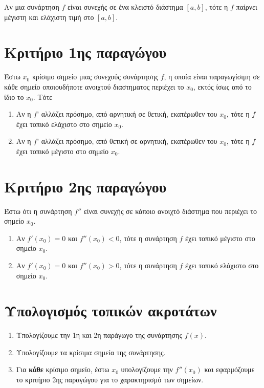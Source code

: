     

\begin{thm}
    Αν μια συνάρτηση $f$ είναι συνεχής σε ένα κλειστό διάστημα $ [a,b] $, τότε η $f$
    παίρνει μέγιστη και ελάχιστη τιμή στο $ [a,b] $.
\end{thm}

    \section*{Κριτήριο 1ης παραγώγου}
    Έστω $ x_{0} $ κρίσιμο σημείο μιας συνεχούς συνάρτησης $f$, η οποία είναι παραγωγίσιμη σε κάθε
    σημείο οποιουδήποτε ανοιχτού διαστηματος περιέχει το $ x_{0} $, εκτός ίσως από το ίδιο το $
    x_{0} $. Τότε
    \begin{enumerate}
        \item Αν η $f$' αλλάζει πρόσημο, από αρνητική σε θετική, εκατέρωθεν του $ x_{0} $, τότε η
            $f$ έχει τοπικό ελάχιστο στο σημείο $ x_{0} $.
        \item Αν η $f$' αλλάζει πρόσημο, από θετική σε αρνητική, εκατέρωθεν του $ x_{0} $, τότε η
            $f$ έχει τοπικό μέγιστο στο σημείο $ x_{0} $.
    \end{enumerate}

    \section*{Κριτήριο 2ης παραγώγου}
    Έστω ότι η συνάρτηση $ f'' $ είναι συνεχής σε κάποιο ανοιχτό διάστημα που περιέχει το σημείο $ x_{0} $.

\begin{enumerate}
    \item Αν $ f'(x_{0}) = 0 $ και $ f''(x_{0}) < 0 $, τότε η συνάρτηση $f$ έχει τοπικό μέγιστο στο
        σημείο $ x_{0} $.
    \item Αν $ f'(x_{0}) = 0 $ και $ f''(x_{0}) > 0 $, τότε η συνάρτηση $f$ έχει τοπικό ελάχιστο στο σημείο $ x_{0} $.

\end{enumerate}



    \section*{Υπολογισμός τοπικών ακροτάτων}
    \begin{enumerate}
        \item Υπολογίζουμε την 1η και 2η παράγωγο της συνάρτησης $ f(x) $.
        \item Υπολογίζουμε τα κρίσιμα σημεία της συνάρτησης.
        \item Για \textbf{κάθε} κρίσιμο σημείο, έστω $ x_{0} $ υπολογίζουμε την $ f''(x_{0}) $ και
            εφαρμόζουμε το κριτήριο 2ης παραγώγου για το χαρακτηρισμό των σημείων.
    \end{enumerate}

